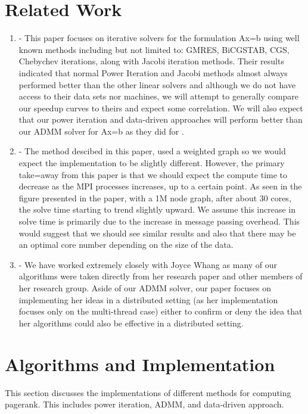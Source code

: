 \documentclass[letterpaper,12pt,onecolumn]{article}
\begin{document}
\section{Related Work}

\begin{enumerate}
  \item \cite{Fast Parallel} - This paper focuses on iterative solvers for the formulation Ax=b using well known methods including but not limited to: GMRES, BiCGSTAB, CGS, Chebychev iterations, along with Jacobi iteration methods. Their results indicated that normal Power Iteration and Jacobi methods almost always performed better than the other linear solvers and although we do not have access to their data sets nor machines, we will attempt to generally compare our speedup curves to theirs and expect some correlation. We will also expect that our power iteration and data-driven approaches will perform better than our ADMM solver for Ax=b as they did for \cite{Fast Parallel}.
  \item \cite{MPIPR} - The method descibed in this paper, used a weighted graph so we would expect the implementation to be slightly different. However, the primary take=away from this paper is that we should expect the compute time to decrease as the MPI processes increases, up to a certain point. As seen in the figure presented in the paper, with a 1M node graph, after about 30 cores, the solve time starting to trend slightly upward. We assume this increase in solve time is primarily due to the increase in message passing overhead. This would suggest that we should see similar results and also that there may be an optimal core number depending on the size of the data. 
  \item \cite{Joyce} - We have worked extremely closely with Joyce Whang as many of our algorithms were taken directly from her research paper and other members of her research group. Aside of our ADMM solver, our paper focuses on implementing her ideas in a distributed setting (as her implementation focuses only on the multi-thread case) either to confirm or deny the idea that her algorithms could also be effective in a distributed setting.
\end{enumerate}


\section{Algorithms and Implementation}

This section discusses the implementations of different methods for computing pagerank. This includes power iteration, ADMM, and data-driven approach. 
\end{document}
